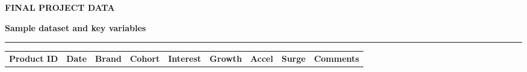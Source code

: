 \documentclass[aspectratio=169, 10pt]{beamer}
\newcommand{\slideheader}[3]{%
        \vspace{-0.25cm}%
        \noindent\begin{minipage}[t]{0.88\linewidth}%
            {\fontsize{7pt}{8.5pt}\selectfont \textbf{\color{BlueAccent}#1}}\par\vspace{1pt}%
            {\fontsize{11.5pt}{13.5pt}\selectfont \textbf{\color{NavyPrimary}#2}}%
        \end{minipage}%
        \hfill%
        \begin{minipage}[t]{0.10\linewidth}%
            \raggedleft{\fontsize{12pt}{14pt}\selectfont \textbf{\color{CoralAccent}#3}}%
        \end{minipage}\par%
        \vspace{2pt}%
        \textcolor{CardBorder}{\rule{\linewidth}{0.6pt}}\par%
        \vspace{3pt}%
    }
\begin{document}
                                                                                                                                                                                                       
    \begin{frame}[t]                                                                                                                                                                                   
        \slideheader{FINAL PROJECT DATA}{Sample dataset and key variables}{05}                                                                                                                         
        \vspace{-0.1cm}                                                                                                                                                                                
        \begin{table}[h]                                                                                                                                                                               
            \centering\scriptsize                                                                                                                                                                      
            \begin{tabular}{llccccccl}                                                                                                                                                                 
                \toprule                                                                                                                                                                               
                \rowcolor{NavyPrimary!15} \textbf{Product ID} & \textbf{Date} & \textbf{Brand} & \textbf{Cohort} & \textbf{Interest} & \textbf{Growth} & \textbf{Accel} & \textbf{Surge} &             
  \textbf{Comments} \\                                                                                                                                                                                 

\end{tabular}
\end{table}
\end{frame}
\end{document}
